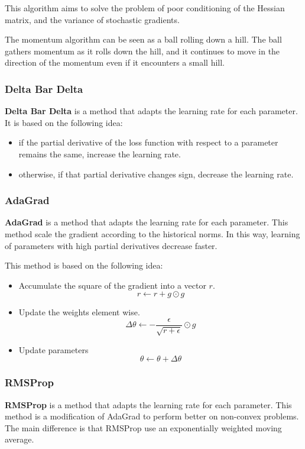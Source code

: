 This algorithm aims to solve the problem of poor conditioning of the Hessian
matrix, and the variance of stochastic gradients.

The momentum algorithm can be seen as a ball rolling down a hill. The ball
gathers momentum as it rolls down the hill, and it continues to move in the
direction of the momentum even if it encounters a small hill.
\subsubsection{Delta Bar Delta}
\textbf{Delta Bar Delta} is a method that adapts the learning rate for each
parameter. It is based on the following idea:
\begin{itemize}
    \item if the partial derivative of the loss function with respect to a
          parameter remains the same, increase the learning rate.
    \item otherwise, if that partial derivative changes sign, decrease
          the learning rate.
\end{itemize}
\subsubsection{AdaGrad}
\textbf{AdaGrad} is a method that adapts the learning rate for each parameter.
This method scale the gradient according to the historical norms. In this way,
learning of parameters with high partial derivatives decrease faster.

This method is based on the following idea:
\begin{itemize}
    \item Accumulate the square of the gradient into a vector $r$.
          \begin{equation}
              r \gets r + g \odot g
          \end{equation}
    \item Update the weights element wise.
          \begin{equation}
              \Delta\theta \gets - \frac{\epsilon}{\sqrt{r + \epsilon}} \odot g
          \end{equation}
    \item Update parameters
          \begin{equation}
              \theta \gets \theta + \Delta \theta
          \end{equation}
\end{itemize}
\subsubsection{RMSProp}
\textbf{RMSProp} is a method that adapts the learning rate for each parameter.
This method is a modification of AdaGrad to perform better on non-convex problems.
The main difference is that RMSProp use an exponentially weighted moving average.


